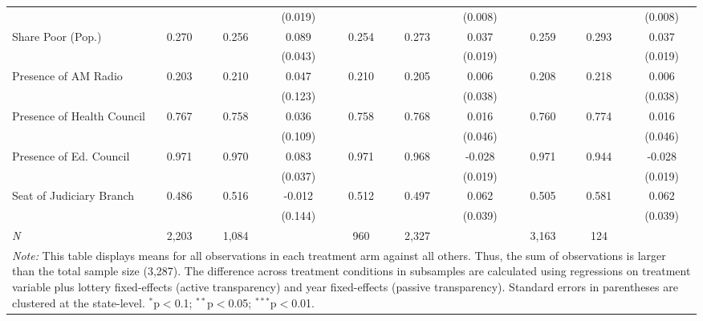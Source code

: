 \begin{table}[!htbp]
\begin{tabular}{@{\extracolsep{-4pt}}l@{\extracolsep{-3pt}}ccccccccc}
                                     &       &       & (0.019)&       &       & (0.008)&        &       & (0.008)   \\
Share Poor (Pop.)                    & 0.270 & 0.256 & 0.089  & 0.254 & 0.273 & 0.037  &  0.259 & 0.293 & 0.037     \\
                                     &       &       & (0.043)&       &       & (0.019)&        &       & (0.019)   \\
Presence of AM Radio                 & 0.203 & 0.210 & 0.047  & 0.210 & 0.205 & 0.006  &  0.208 & 0.218 & 0.006     \\
                                     &       &       & (0.123)&       &       & (0.038)&        &       & (0.038)   \\
Presence of Health Council           & 0.767 & 0.758 & 0.036  & 0.758 & 0.768 & 0.016  &  0.760 & 0.774 & 0.016     \\
                                     &       &       & (0.109)&       &       & (0.046)&        &       & (0.046)   \\
Presence of Ed. Council              & 0.971 & 0.970 & 0.083  & 0.971 & 0.968 & -0.028 &  0.971 & 0.944 & -0.028    \\
                                     &       &       & (0.037)&       &       & (0.019)&        &       & (0.019)   \\
Seat of Judiciary Branch             & 0.486 & 0.516 & -0.012 & 0.512 & 0.497 & 0.062  &  0.505 & 0.581 & 0.062     \\
                                     &       &       & (0.144)&       &       & (0.039)&        &       & (0.039) \B\\
\hline
\emph{N}                             & 2,203 & 1,084 &        & 960   & 2,327 &        & 3,163  & 124   &  \T  \B \\
\hline
\hline
\multicolumn{10}{p{\textwidth}}{\emph{Note:} This table displays means for all observations in each treatment arm against all others. Thus, the sum of observations is larger than the total sample size (3,287). The difference across treatment conditions in subsamples are calculated using regressions on treatment variable plus lottery fixed-effects (active transparency) and year fixed-effects (passive transparency). Standard errors in parentheses are clustered at the state-level. $^{*}$p$<$0.1; $^{**}$p$<$0.05; $^{***}$p$<$0.01.}
\end{tabular}
\end{table}




